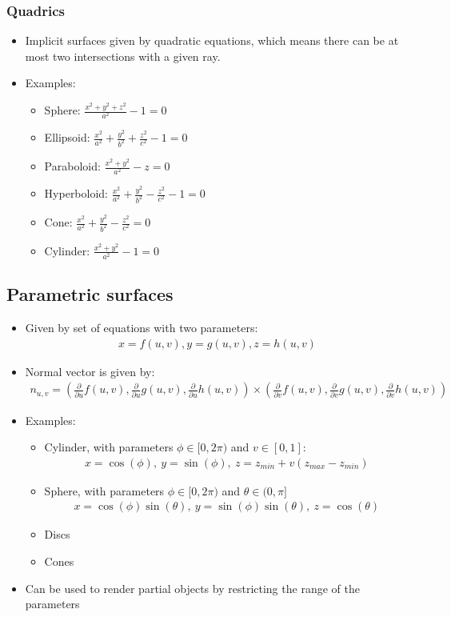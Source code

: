 \documentclass{scrartcl}
\newcommand{\Partial}[1]{\frac{\partial}{\partial #1}}
\begin{document}
\subsubsection*{Quadrics}
\begin{itemize}
    \item Implicit surfaces given by quadratic equations, which means there can be at most two intersections with a given ray.
    \item Examples:
    \begin{itemize}
        \item Sphere: $\frac{x^2+y^2+z^2}{a^2}-1 = 0$
        \item Ellipsoid: $\frac{x^2}{a^2}+\frac{y^2}{b^2}+\frac{z^2}{c^2}-1 = 0$
        \item Paraboloid: $\frac{x^2+y^2}{a^2}-z=0$
        \item Hyperboloid: $\frac{x^2}{a^2}+\frac{y^2}{b^2}-\frac{z^2}{c^2}-1 = 0$
        \item Cone: $\frac{x^2}{a^2}+\frac{y^2}{b^2}-\frac{z^2}{c^2} = 0$
        \item Cylinder: $\frac{x^2+y^2}{a^2}-1=0$
    \end{itemize}
\end{itemize}
\subsection*{Parametric surfaces}
\begin{itemize}
    \item Given by set of equations with two parameters:
    \begin{align*}
        x = f(u,v), y = g(u,v), z = h(u,v)
    \end{align*}
    \item Normal vector is given by:
    \begin{align*}
        n_{u,v} = \left(\Partial{u}f(u,v), \Partial{u}g(u,v), \Partial{u}h(u,v)\right) \times \left(\Partial{v}f(u,v), \Partial{v}g(u,v), \Partial{v}h(u,v)\right)
    \end{align*}
    \item Examples:
    \begin{itemize}
        \item Cylinder, with parameters $\phi \in [0, 2\pi)$ and $v \in [0,1]$: 
        \begin{align*}
            x = \cos(\phi),\ y = \sin(\phi),\ z = z_{min} + v(z_{max} - z_{min})
        \end{align*}
        \item Sphere, with parameters $\phi \in [0, 2\pi)$ and $\theta \in (0,\pi]$
        \begin{align*}
            x = \cos(\phi)\sin(\theta),\ y = \sin(\phi)\sin(\theta),\ z = \cos(\theta)
        \end{align*}
        \item Discs
        \item Cones
    \end{itemize}
    \item Can be used to render partial objects by restricting the range of the parameters
\end{itemize}
\end{document}
